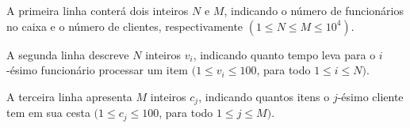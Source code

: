 A primeira linha conterá dois inteiros $N$ e $M$, indicando o número de funcionários no caixa e o número de clientes, respectivamente $(1 \leq N \leq M \leq 10^4)$.

A segunda linha descreve $N$ inteiros $v_i$, indicando quanto tempo leva para o $i$-ésimo funcionário processar um item $(1 \leq v_i \leq 100$, para todo $1 \leq i \leq N)$.

A terceira linha apresenta $M$ inteiros $c_j$, indicando quantos itens o $j$-ésimo cliente tem em sua cesta $(1 \leq c_j \leq 100$, para todo $1 \leq j \leq M)$.
